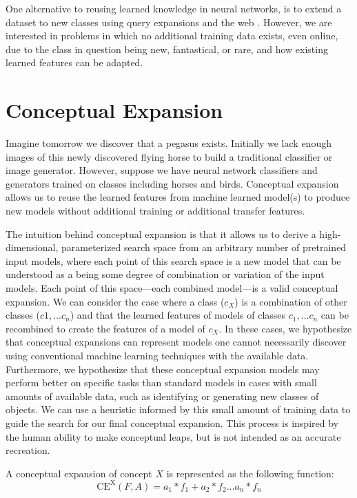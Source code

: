 \documentclass[letterpaper]{article}
\begin{document}
One alternative to reusing learned knowledge in neural networks, is to extend a dataset to new classes using query expansions and the web \cite{divvala2014learning,yao2017exploiting} . However, we are interested in problems in which no additional training data exists, even online, due to the class in question being new, fantastical, or rare, and how existing learned features can be adapted.

\section{Conceptual Expansion}

Imagine tomorrow we discover that a pegasus exists. 
Initially we lack enough images of this newly discovered flying horse to build a traditional classifier or image generator. 
However, suppose we have neural network classifiers and generators trained on classes including horses and birds. 
Conceptual expansion allows us to reuse the learned features from machine learned model(s) to produce new models without additional training or additional transfer features.


The intuition behind conceptual expansion is that it allows us to derive a high-dimensional, parameterized search space from an arbitrary number of pretrained input models, where each point of this search space is a new model that can be understood as a being some degree of combination or variation of the input models. 
Each point of this space---each combined model---is a valid conceptual expansion.
We can consider the case where a class ($c_X$) is a combination of other classes ($c1, ...c_n$) and that the learned features of models of classes $c_1, ...c_n$ can be recombined to create the features of a model of $c_X$. In these cases, we hypothesize that conceptual expansions can represent models one cannot necessarily discover using conventional machine learning techniques with the available data. 
Furthermore, we hypothesize that these conceptual expansion models may perform better on specific tasks than standard models in cases with small amounts of available data, such as identifying or generating new classes of objects.
%
We can use a heuristic informed by this small amount of training data to guide the search for our final conceptual expansion.
This process is inspired by the human ability to make conceptual leaps, but is not intended as an accurate recreation.

A conceptual expansion of concept $X$ is represented as the following function:
\begin{equation} \label{eq1}
  \mathrm{CE^X}(F,A) = a_1*f_1+a_2*f_2... a_n*f_n
\end{equation}
\end{document}
